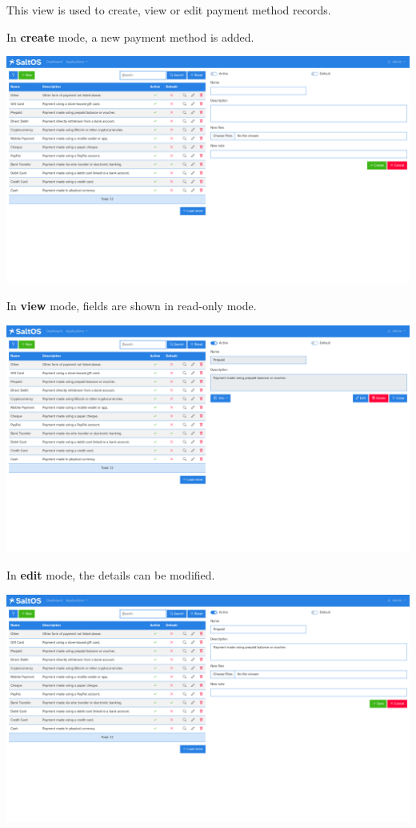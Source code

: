\documentclass[a4paper]{article}
\begin{document}
This view is used to create, view or edit payment method records.

In \textbf{create} mode, a new payment method is added.

\begin{center}\includegraphics[width=1\textwidth]{../ujest/snaps/test-screenshots-js-screenshots-sales-payment-methods-create-en-us-1-snap.png}\end{center}

In \textbf{view} mode, fields are shown in read-only mode.

\begin{center}\includegraphics[width=1\textwidth]{../ujest/snaps/test-screenshots-js-screenshots-sales-payment-methods-view-10-en-us-1-snap.png}\end{center}

In \textbf{edit} mode, the details can be modified.

\begin{center}\includegraphics[width=1\textwidth]{../ujest/snaps/test-screenshots-js-screenshots-sales-payment-methods-edit-10-en-us-1-snap.png}\end{center}
\end{document}

